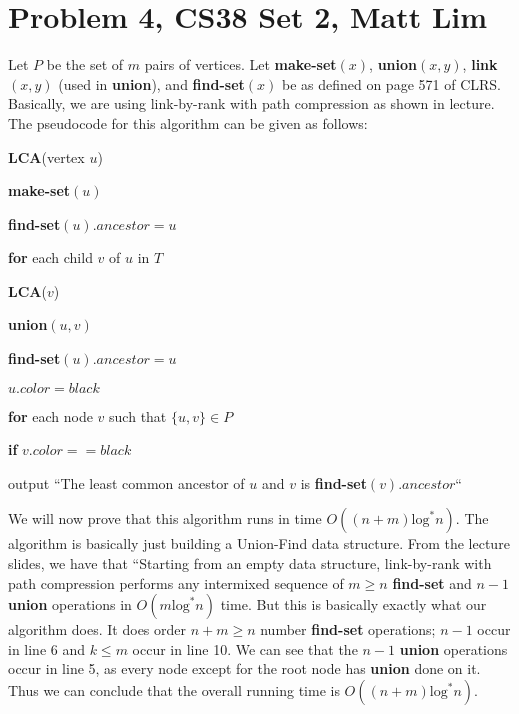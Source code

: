 \documentclass{article}
\begin{document}
\section*{Problem 4, CS38 Set 2, Matt Lim}
Let $P$ be the set of $m$ pairs of vertices. Let \textbf{make-set}$(x)$,
\textbf{union}$(x,y)$, \textbf{link}$(x,y)$ (used in \textbf{union}), and
\textbf{find-set}$(x)$ be as defined on page 571 of CLRS. Basically, we are
using
link-by-rank with path compression as shown in lecture.
The pseudocode for this algorithm can be given as follows:
\vspace{5mm}

\noindent \textbf{LCA}(vertex $u$)
\begin{enumerate}
    \item \textbf{make-set}$(u)$
    \item \textbf{find-set}$(u).ancestor = u$
    \item \textbf{for} each child $v$ of $u$ in $T$
    {\setlength\itemindent{25pt} \item \textbf{LCA}($v$) }
    {\setlength\itemindent{25pt} \item \textbf{union}$(u,v)$ }
    {\setlength\itemindent{25pt} \item \textbf{find-set}$(u).ancestor = u$ }
    \item $u.color = black$
    \item \textbf{for} each node $v$ such that $\{u,v\} \in P$
    {\setlength\itemindent{25pt} \item \textbf{if} $v.color == black$ }
    {\setlength\itemindent{50pt} \item output ``The least common ancestor of $u$
        and $v$ is \textbf{find-set}$(v).ancestor$`` }
\end{enumerate}

We will now prove that this algorithm runs in time $O((n + m)\text{log}^*n)$.
The algorithm is basically just
building a Union-Find data structure. From the lecture slides, we have
that ``Starting from an empty data structure, link-by-rank with path compression
performs any intermixed sequence of $m \ge n$ \textbf{find-set} and $n-1$
\textbf{union} operations in $O(m \text{log}^*n)$ time. But this is basically exactly
what our algorithm does. It does order $n + m \ge n$ number \textbf{find-set}
operations; $n-1$ occur in line 6 and $k \le m$ occur in line 10.
We can see that the $n-1$ \textbf{union}
operations occur in line 5, as every node except for the root node has
\textbf{union} done on it. Thus we can conclude that the overall running time
is $O((n+m) \text{log}^*n)$.
\end{document}
